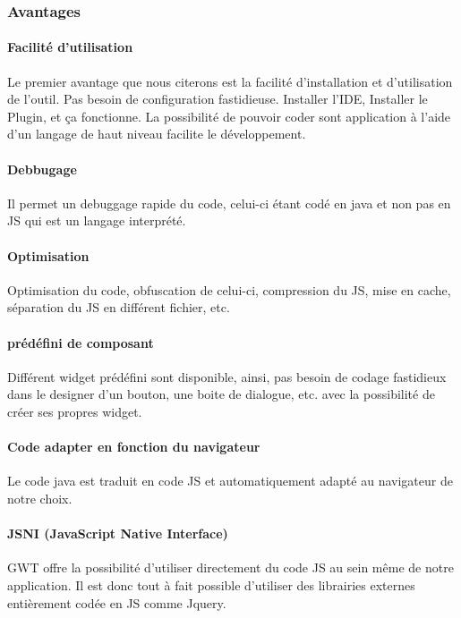\subsubsection{Avantages}

\paragraph{Facilité d'utilisation}
Le premier avantage que nous citerons est la facilité d'installation et d'utilisation de l'outil. Pas besoin de configuration fastidieuse. Installer l'IDE, Installer le Plugin, et ça fonctionne.
La possibilité de pouvoir coder sont application à l'aide d'un langage de haut niveau facilite le développement.

\paragraph{Debbugage}
Il permet un debuggage rapide du code, celui-ci étant codé en java et non pas en JS qui est un langage interprété.

\paragraph{Optimisation}
Optimisation du code, obfuscation de celui-ci, compression du JS, mise en cache, séparation du JS en différent fichier, etc.

\paragraph{prédéfini de composant}
Différent widget prédéfini sont disponible, ainsi, pas besoin de codage fastidieux dans le designer d'un bouton, une boite de dialogue, etc. avec la possibilité de créer ses propres widget.

\paragraph{Code adapter en fonction du navigateur}
Le code java est traduit en code JS et automatiquement adapté au navigateur de notre choix.

\paragraph{JSNI (JavaScript Native Interface)}
GWT offre la possibilité d'utiliser directement du code JS au sein même de notre application. Il est donc tout à fait possible d'utiliser des librairies externes entièrement codée en JS comme Jquery.

